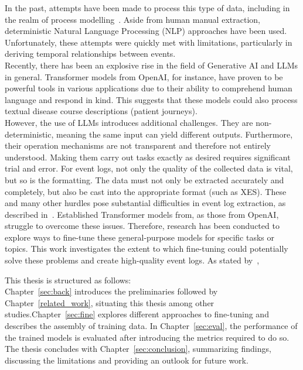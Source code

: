 In the past, attempts have been made to process this type of data, including in the realm of process modelling~\cite{friedrich_process_2011}. Aside from  human manual extraction,  deterministic Natural Language Processing (NLP) approaches have been used. Unfortunately, these attempts were quickly met with limitations, particularly in deriving temporal relationships between events.\\
Recently, there has been an explosive rise in the field of Generative AI and LLMs in general. Transformer models from OpenAI, for instance, have proven to be powerful tools in various applications due to their ability to comprehend human language and respond in kind. This suggests that these models could also process textual disease course descriptions (patient journeys).\\
However, the use of LLMs introduces additional challenges. They are non-deterministic, meaning the same input can yield different outputs. Furthermore, their operation mechanisms are not transparent and therefore not entirely understood. Making them carry out tasks exactly as desired requires significant trial and error. For event logs, not only the quality of the collected data is vital, but so is the formatting. The data must not only be extracted accurately and completely, but also be cast into the appropriate format (such as XES).
These and many other hurdles pose substantial difficulties in event log extraction, as described in~\cite{munoz-gama_process_2022}. Established Transformer models from, as those from OpenAI, struggle to overcome these issues. Therefore, research has been conducted to explore ways to fine-tune these general-purpose models for specific tasks or topics. This work investigates the extent to which fine-tuning could potentially solve these problems and create high-quality event logs. As stated by~\cite{latif_fine-tuning_2024}, 
\begin{quote}
\end{quote}

This thesis is structured as follows:\\
Chapter~\ref{sec:back} introduces the preliminaries followed by Chapter~\ref{related_work}, situating this thesis among other studies.Chapter~\ref{sec:fine} explores different approaches to fine-tuning and describes the assembly of training data. In Chapter~\ref{sec:eval}, the performance of the trained models is evaluated after introducing the metrics required to do so. The thesis concludes with Chapter~\ref{sec:conclusion}, summarizing findings, discussing the limitations and providing an outlook for future work.

